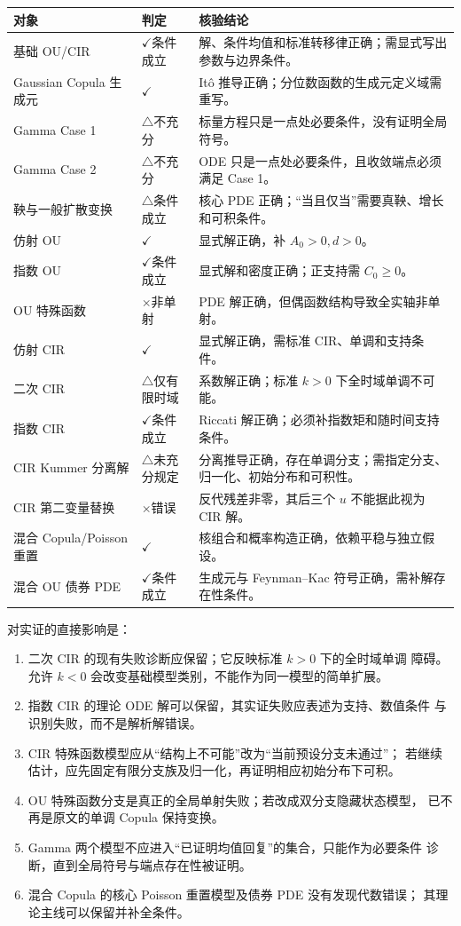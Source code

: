 \documentclass[UTF8,11pt]{ctexart}
\newcommand{\cmark}{\textcolor{green!45!black}{\ensuremath{\checkmark}}}
\newcommand{\wmark}{\textcolor{orange!80!black}{\ensuremath{\triangle}}}
\newcommand{\xmark}{\textcolor{red!70!black}{\ensuremath{\times}}}
\begin{document}
\begin{longtable}{p{}p{}p{}}
\toprule
对象 & 判定 & 核验结论\\
\midrule
\endhead
基础 OU/CIR & \cmark 条件成立 & 解、条件均值和标准转移律正确；需显式写出参数与边界条件。\\
Gaussian Copula 生成元 & \cmark & It\^o 推导正确；分位数函数的生成元定义域需重写。\\
Gamma Case 1 & \wmark 不充分 & 标量方程只是一点处必要条件，没有证明全局符号。\\
Gamma Case 2 & \wmark 不充分 & ODE 只是一点处必要条件，且收敛端点必须满足 Case 1。\\
鞅与一般扩散变换 & \wmark 条件成立 & 核心 PDE 正确；“当且仅当”需要真鞅、增长和可积条件。\\
仿射 OU & \cmark & 显式解正确，补 $A_0>0,d>0$。\\
指数 OU & \cmark 条件成立 & 显式解和密度正确；正支持需 $C_0\geq0$。\\
OU 特殊函数 & \xmark 非单射 & PDE 解正确，但偶函数结构导致全实轴非单射。\\
仿射 CIR & \cmark & 显式解正确，需标准 CIR、单调和支持条件。\\
二次 CIR & \wmark 仅有限时域 & 系数解正确；标准 $k>0$ 下全时域单调不可能。\\
指数 CIR & \cmark 条件成立 & Riccati 解正确；必须补指数矩和随时间支持条件。\\
CIR Kummer 分离解 & \wmark 未充分规定 & 分离推导正确，存在单调分支；需指定分支、归一化、初始分布和可积性。\\
CIR 第二变量替换 & \xmark 错误 & 反代残差非零，其后三个 $u$ 不能据此视为 CIR 解。\\
混合 Copula/Poisson 重置 & \cmark & 核组合和概率构造正确，依赖平稳与独立假设。\\
混合 OU 债券 PDE & \cmark 条件成立 & 生成元与 Feynman--Kac 符号正确，需补解存在性条件。\\
\bottomrule
\end{longtable}

对实证的直接影响是：
\begin{enumerate}
 \item 二次 CIR 的现有失败诊断应保留；它反映标准 $k>0$ 下的全时域单调
       障碍。允许 $k<0$ 会改变基础模型类别，不能作为同一模型的简单扩展。
 \item 指数 CIR 的理论 ODE 解可以保留，其实证失败应表述为支持、数值条件
       与识别失败，而不是解析解错误。
 \item CIR 特殊函数模型应从“结构上不可能”改为“当前预设分支未通过”；
       若继续估计，应先固定有限分支族及归一化，再证明相应初始分布下可积。
 \item OU 特殊函数分支是真正的全局单射失败；若改成双分支隐藏状态模型，
       已不再是原文的单调 Copula 保持变换。
 \item Gamma 两个模型不应进入“已证明均值回复”的集合，只能作为必要条件
       诊断，直到全局符号与端点存在性被证明。
 \item 混合 Copula 的核心 Poisson 重置模型及债券 PDE 没有发现代数错误；
       其理论主线可以保留并补全条件。
\end{enumerate}
\end{document}
